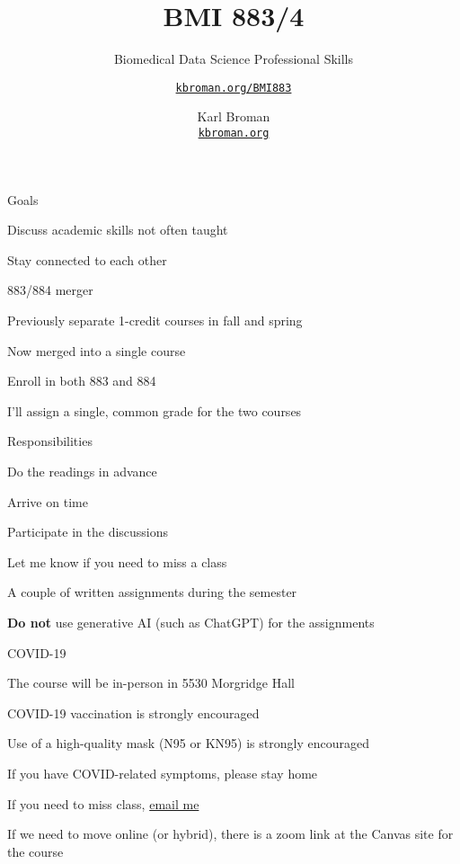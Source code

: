 \documentclass[aspectratio=169,12pt,t]{beamer}
\title{BMI 883/4}
\subtitle{Biomedical Data Science Professional Skills}
\author{\href{https://kbroman.org/BMI883}{\tt kbroman.org/BMI883} }
\institute{}
\date{\small \hspace{3in} Karl Broman \\
  \hspace{3in} \href{https://kbroman.org}{\color{foreground}
    \small \tt kbroman.org}}
\begin{document}
{
\frame{
  \titlepage
} }




\begin{frame}{Goals}

  \bbi
\item Discuss academic skills not often taught
\item Stay connected to each other
  \ei

\end{frame}




\begin{frame}{883/884 merger}

  \bbi
\item Previously separate 1-credit courses in fall and spring
\item Now merged into a single course
\item Enroll in both 883 and 884
\item I'll assign a single, common grade for the two courses
  \ei

\end{frame}




\begin{frame}{Responsibilities}

  \bbi
\item Do the readings in advance
\item Arrive on time
\item Participate in the discussions
\item Let me know if you need to miss a class
\item A couple of written assignments during the semester
\item {\bf Do not} use generative AI (such as ChatGPT) for the assignments
  \ei

\end{frame}



\begin{frame}{COVID-19}

  \bbi
\item The course will be in-person in 5530 Morgridge Hall
\item COVID-19 vaccination is strongly encouraged
\item Use of a high-quality mask (N95 or KN95) is strongly encouraged
\item If you have COVID-related symptoms, please stay home
\item If you need to miss class, \href{mailto:broman@wisc.edu}{email me}
\item If we need to move online (or hybrid), there is a zoom link at
  the Canvas site for the course
  \ei

\end{frame}
\end{document}
